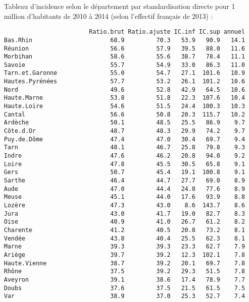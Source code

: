 \documentclass[11pt,a4paper]{article}\usepackage[]{graphicx}\usepackage[]{color}
\makeatletter
\newenvironment{kframe}{%
 \def\at@end@of@kframe{}%
 \ifinner\ifhmode%
  \def\at@end@of@kframe{\end{minipage}}%
  \begin{minipage}{\columnwidth}%
 \fi\fi%
 \def\FrameCommand##1{\hskip\@totalleftmargin \hskip-\fboxsep
 \colorbox{shadecolor}{##1}\hskip-\fboxsep
     \hskip-\linewidth \hskip-\@totalleftmargin \hskip\columnwidth}%
 \MakeFramed {\advance\hsize-\width
   \@totalleftmargin\z@ \linewidth\hsize
   \@setminipage}}%
 {\par\unskip\endMakeFramed%
 \at@end@of@kframe}
\newenvironment{knitrout}{}{} %
\makeatother
\begin{document}
Tableau d'incidence selon le département par standardisation directe pour 1 million d'habitants de 2010 à 2014 (selon l'effectif français de 2013) :
\begin{knitrout}
\color{fgcolor}\begin{kframe}
\begin{verbatim}
                        Ratio.brut Ratio.ajuste IC.inf IC.sup annuel
Bas.Rhin                      68.9         70.3   53.9   90.9   14.1
Réunion                       56.6         57.9   39.5   88.0   11.6
Morbihan                      58.6         55.6   38.7   78.4   11.1
Savoie                        55.7         54.9   33.0   86.3   11.0
Tarn.et.Garonne               55.0         54.7   27.1  101.6   10.9
Hautes.Pyrénées               57.7         53.2   26.1  101.2   10.6
Nord                          49.6         52.8   42.9   64.5   10.6
Haute.Marne                   53.8         51.8   22.3  107.6   10.4
Haute.Loire                   54.6         51.5   24.4  100.3   10.3
Cantal                        56.6         50.8   20.3  115.7   10.2
Ardèche                       50.1         48.5   25.5   86.9    9.7
Côte.d.Or                     48.7         48.3   29.9   74.2    9.7
Puy.de.Dôme                   47.4         47.0   30.4   69.7    9.4
Tarn                          48.1         46.7   25.8   79.8    9.3
Indre                         47.6         46.2   20.8   94.0    9.2
Loire                         47.8         45.5   30.5   65.8    9.1
Gers                          50.7         45.4   19.1  100.8    9.1
Sarthe                        46.4         44.7   27.7   69.0    8.9
Aude                          47.0         44.4   24.0   77.6    8.9
Meuse                         45.1         44.0   17.6   93.9    8.8
Lozère                        47.3         43.0    8.6  143.7    8.6
Jura                          43.0         41.7   19.0   82.7    8.3
Oise                          40.9         41.0   26.7   61.2    8.2
Charente                      41.2         40.5   20.8   73.2    8.1
Vendée                        43.8         40.4   25.5   62.3    8.1
Marne                         39.3         39.3   23.3   62.7    7.9
Ariège                        39.7         39.2   12.3  102.1    7.8
Haute.Vienne                  38.7         39.2   20.1   69.7    7.8
Rhône                         37.5         39.2   29.3   51.5    7.8
Aveyron                       39.1         38.6   17.4   78.9    7.7
Doubs                         37.6         37.5   21.5   61.5    7.5
Var                           38.9         37.0   25.3   52.7    7.4

\end{verbatim}
\end{kframe}
\end{knitrout}
\end{document}

